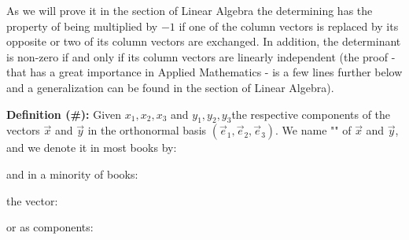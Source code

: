 	As we will prove it in the section of Linear Algebra the determining has the property of being multiplied by $-1$ if one of the column vectors is replaced by its opposite or two of its column vectors are exchanged. In addition, the determinant is non-zero if and only if its column vectors are linearly independent (the proof - that has a great importance in Applied Mathematics - is a few lines further below and a generalization  can be found in the section of Linear Algebra).
	
	\textbf{Definition (\#\mydef):} Given $x_1,x_2,x_3$ and $y_1,y_2,y_3$the respective components of the vectors $\vec{x}$ and  $\vec{y}$ in the orthonormal basis $(\vec{e}_1,\vec{e}_2,\vec{e}_3)$. We name "" of $\vec{x}$ and $\vec{y}$, and we denote it in most books by:
	
	and in a minority of books:
	
	the vector:
	
	or as components\label{cross product matrix form}:
	
